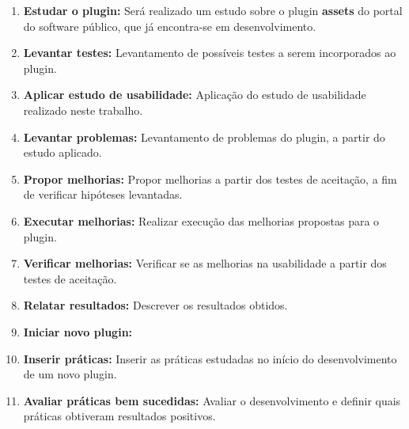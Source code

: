 \begin{enumerate}
\item \textbf{Estudar o plugin:} Será realizado um estudo sobre o plugin \textbf{assets} do portal do software público, que já encontra-se em desenvolvimento.
\item \textbf{Levantar testes:} Levantamento de possíveis testes a serem incorporados ao plugin.
\item \textbf{Aplicar estudo de usabilidade:} Aplicação do estudo de usabilidade realizado neste trabalho.
\item \textbf{Levantar problemas:} Levantamento de problemas do plugin, a partir do estudo aplicado.
\item  \textbf{Propor melhorias:} Propor melhorias a partir dos testes de aceitação, a fim de verificar hipóteses levantadas.
\item \textbf{Executar melhorias:} Realizar execução das melhorias propostas para o plugin.
\item \textbf{Verificar melhorias:} Verificar se as melhorias na usabilidade a partir dos testes de aceitação.
\item \textbf{Relatar resultados:} Descrever os resultados obtidos.
\item \textbf{Iniciar novo plugin:} 
\item \textbf{Inserir práticas:} Inserir as práticas estudadas no início do desenvolvimento de um novo plugin.
\item \textbf{Avaliar práticas bem sucedidas:} Avaliar o desenvolvimento e definir quais práticas obtiveram resultados positivos.

\end{enumerate}

